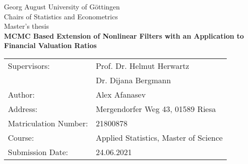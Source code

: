 \begin{titlepage}
	\begin{center}
	\vspace*{4cm}
	{\LARGE Georg August University of Göttingen}\\
	\vskip 1.5cm
	{\large Chairs of Statistics and Econometrics}\\
	\vskip 0.5cm
	{\large Master's thesis}\\
	\vskip 2.0cm
	{\LARGE\textbf{MCMC Based Extension of Nonlinear Filters with an Application to Financial Valuation Ratios}}\\
	\end{center}
\vfill
\vfill
\begin{tabular}{ll}
	Supervisors: & Prof. Dr. Helmut Herwartz \\
	             & Dr. Dijana Bergmann \\
	Author: & Alex Afanasev \\
	Address: & Mergendorfer Weg 43, 01589 Riesa \\
	Matriculation Number: & 21800878 \\
	Course: & Applied Statistics, Master of Science \\
	Submission Date: & 24.06.2021 \\
\end{tabular}
\end{titlepage}
